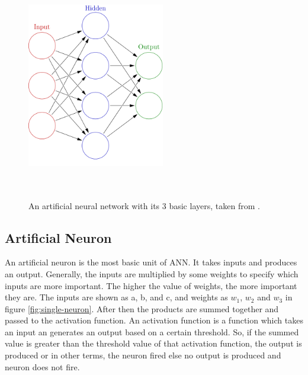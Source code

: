 \begin{figure}[htpb]
	\centering
	\includegraphics[width=6cm,height=10cm,keepaspectratio=true]{images/neural-net}
	\caption{
		An artificial neural network with its 3 basic layers, taken from \cite{wiki:ann}.
	}
	\label{fig:wiki:ann}
\end{figure}


\subsection{Artificial Neuron}
An artificial neuron is the most basic unit of ANN. It takes inputs and produces an output. Generally, the inputs are multiplied by some weights to specify which inputs are more important. The higher the value of weights, the more important they are. The inputs are shown as a, b, and c, and weights as $w_1$, $w_2$ and $w_3$ in figure \ref{fig:single-neuron}. After then the products are summed together and passed to the activation function. An activation function is a function which takes an input an generates an output based on a certain threshold. So, if the summed value is greater than the threshold value of that activation function, the output is produced or in other terms, the neuron fired else no output is produced and neuron does not fire.

